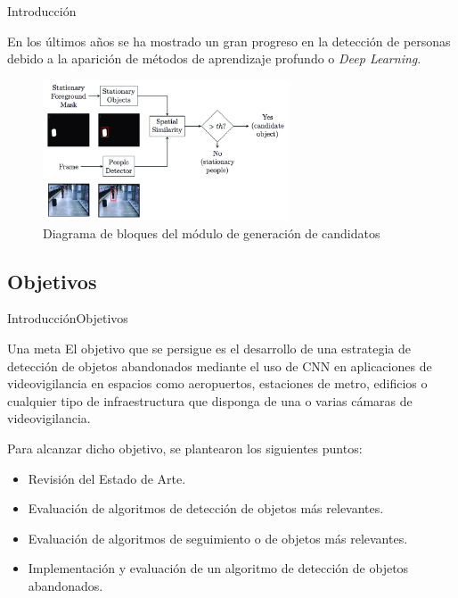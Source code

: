 
\begin{frame}{Introducción}

\justifying
En los últimos años se ha mostrado un gran progreso en la detección de personas debido a la aparición de métodos de aprendizaje profundo o \textit{Deep Learning}.

\begin{figure}[ht]
\centering
\includegraphics[width=0.65\textwidth]{Images/introduccion/Block-diagram-Stationary-detection.png}
\caption{\label{fig:diagram-stationary-detection}Diagrama de bloques del módulo de generación de candidatos}
\end{figure}
    
\end{frame}


\subsection{Objetivos}

\begin{frame}{Introducción}{Objetivos}

\begin{exampleblock}{Una meta}
\justifying
El objetivo que se persigue es el desarrollo de una estrategia de detección de objetos abandonados mediante el uso de CNN en aplicaciones de videovigilancia en espacios como aeropuertos, estaciones de metro, edificios o cualquier tipo de infraestructura que disponga de una o varias cámaras de videovigilancia.
\end{exampleblock}

\vspace{0.3cm}
Para alcanzar dicho objetivo, se plantearon los siguientes puntos:
\vspace{0.1cm}

\begin{itemize}
    \justifying
    \item Revisión del Estado de Arte.
    \item Evaluación de algoritmos de detección de objetos más relevantes.
    \item Evaluación de algoritmos de seguimiento o de objetos más relevantes.
    \item Implementación y evaluación de un algoritmo de detección de objetos abandonados.
\end{itemize}
  
\end{frame}
